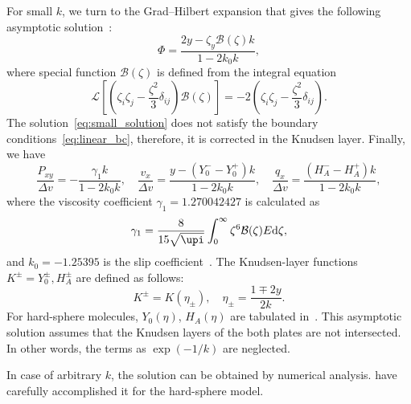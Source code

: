 \documentclass[]{jfm}
\newcommand{\dd}{\mathrm{d}}
\begin{document}
For small \(k\), we turn to the Grad--Hilbert expansion
that gives the following asymptotic solution~\citep{Ohwada1990, Sone2007}:
\begin{equation}\label{eq:small_solution}
    \Phi = \frac{2y - \zeta_y \mathcal{B}(\zeta) k}{1-2k_0k},
\end{equation}
where special function \(\mathcal{B}(\zeta)\) is defined from the integral equation
\begin{equation}\label{eq:transport_B}
    \mathcal{L}\left[\left(\zeta_i\zeta_j-\frac{\zeta^2}3\delta_{ij}\right) \mathcal{B}(\zeta)\right]
        = -2\left(\zeta_i\zeta_j-\frac{\zeta^2}3\delta_{ij}\right).
\end{equation}
The solution~\eqref{eq:small_solution} does not satisfy the boundary conditions~\eqref{eq:linear_bc},
therefore, it is corrected in the Knudsen layer. Finally, we have
\begin{equation}\label{eq:small_macro}
    \frac{P_{xy}}{\Delta{v}} = - \frac{\gamma_1 k}{1-2k_0k}, \quad
    \frac{v_x}{\Delta{v}} = \frac{y - (Y_0^--Y_0^+)k}{1-2k_0k}, \quad
    \frac{q_x}{\Delta{v}} = \frac{(H_A^--H_A^+)k}{1-2k_0k},
\end{equation}
where the viscosity coefficient \(\gamma_1 = 1.270042427\) is calculated as
\begin{equation}\label{eq:gamma_1}
    \gamma_1 = \frac{8}{15\sqrt{\upi}}\int_0^\infty \zeta^6 \mathcal{B}(\zeta)E\dd\zeta,
\end{equation}
and \(k_0 = -1.25395\) is the slip coefficient~\citep{Takata2015}.
The Knudsen-layer functions \(K^\pm = Y_0^\pm, H_A^\pm\) are defined as follows:
\begin{equation}\label{eq:linear_knudsen_functions}
     K^\pm = K(\eta_\pm), \quad \eta_\pm = \frac{1 \mp 2y}{2k}.
\end{equation}
For hard-sphere molecules, \(Y_0(\eta)\), \(H_A(\eta)\)
are tabulated in~\citet{Ohwada1989a, Sone2002, Sone2007, Takata2015}.
This asymptotic solution assumes that the Knudsen layers of the both plates are not intersected.
In other words, the terms as \(\exp(-1/k)\) are neglected.

In case of arbitrary \(k\), the solution can be obtained by numerical analysis.
\citet{Ohwada1990} have carefully accomplished it for the hard-sphere model.
\end{document}
